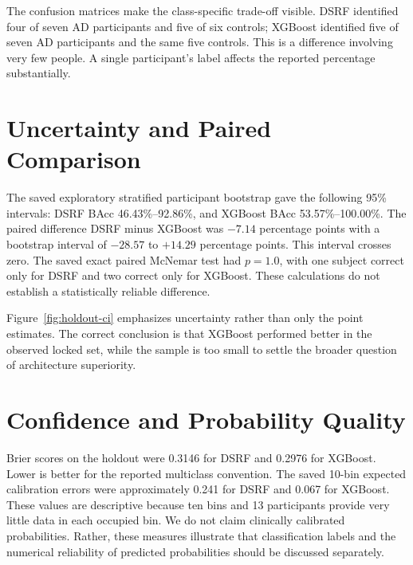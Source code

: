 The confusion matrices make the class-specific trade-off visible. DSRF identified four of seven AD participants and five of six controls; XGBoost identified five of seven AD participants and the same five controls. This is a difference involving very few people. A single participant's label affects the reported percentage substantially.

\section{Uncertainty and Paired Comparison}
The saved exploratory stratified participant bootstrap gave the following 95\% intervals: DSRF BAcc 46.43\%--92.86\%, and XGBoost BAcc 53.57\%--100.00\%. The paired difference DSRF minus XGBoost was $-7.14$ percentage points with a bootstrap interval of $-28.57$ to $+14.29$ percentage points. This interval crosses zero. The saved exact paired McNemar test had $p=1.0$, with one subject correct only for DSRF and two correct only for XGBoost. These calculations do not establish a statistically reliable difference.


Figure~\ref{fig:holdout-ci} emphasizes uncertainty rather than only the point estimates. The correct conclusion is that XGBoost performed better in the observed locked set, while the sample is too small to settle the broader question of architecture superiority.

\section{Confidence and Probability Quality}
Brier scores on the holdout were 0.3146 for DSRF and 0.2976 for XGBoost. Lower is better for the reported multiclass convention. The saved 10-bin expected calibration errors were approximately 0.241 for DSRF and 0.067 for XGBoost. These values are descriptive because ten bins and 13 participants provide very little data in each occupied bin. We do not claim clinically calibrated probabilities. Rather, these measures illustrate that classification labels and the numerical reliability of predicted probabilities should be discussed separately.

